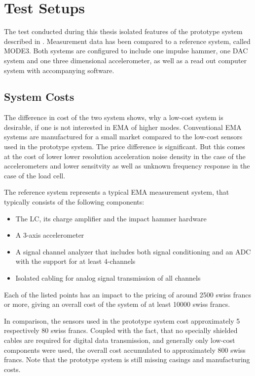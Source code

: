 \chapter{Test Setups%
  \label{chap:\currfilebase}}

The test conducted during this thesis isolated features of the prototype system described in . Measurement data has been compared to a reference system, called MODE3. Both systems are configured to include one impulse hammer, one \ac{DAC} system and one three dimensional accelerometer, as well as a read out computer system with accompanying software.

\section{System Costs}
The difference in cost of the two system shows, why a low-cost system is desirable, if one is not interested in \ac{EMA} of higher modes. Conventional \ac{EMA} systems are manufactured for a small market compared to the low-cost sensors used in the prototype system. The price difference is significant. But this comes at the cost of lower lower resolution acceleration noise density in the case of the accelerometers and lower sensitvity as well as unknown frequency response in the case of the load cell.

The reference system represents a typical \ac{EMA} measurement system, that typically consists of the following components:
\begin{itemize}
  \item The \ac{LC}, its charge amplifier and the impact hammer hardware
  \item A 3-axis accelerometer
  \item A signal channel analyzer that includes both signal conditioning and an \ac{ADC} with the support for at least 4-channels
  \item Isolated cabling for analog signal transmission of all channels
\end{itemize}
Each of the listed points has an impact to the pricing of around 2500 swiss francs or more, giving an overall cost of the system of at least 10000 swiss francs.

In comparison, the sensors used in the prototype system cost approximately 5 respectively 80 swiss francs. Coupled with the fact, that no specially shielded cables are required for digital data transmission, and generally only low-cost components were used, the overall cost accumulated to approximately 800 swiss francs. Note that the prototype system is still missing casings and manufacturing costs.

